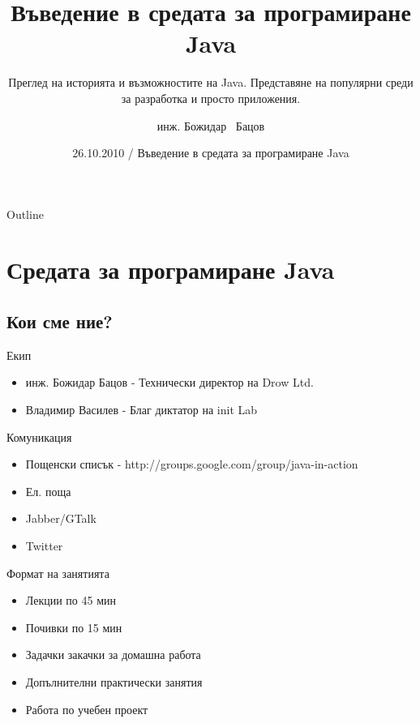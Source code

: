 \documentclass{beamer}
\title[Въведение в средата за програмиране Java] %
{Въведение в средата за програмиране Java}
\subtitle
{Преглед на историята и възможностите на Java. Представяне на
  популярни среди за разработка и просто приложения.} %
\author[инж. Божидар Бацов]{инж. Божидар ~Бацов}
\institute[Drow Ltd.]{Drow Ltd.}
\date[Java Begins]{26.10.2010 / Въведение в средата за програмиране Java}
\begin{document}
\begin{frame}
  \titlepage
\end{frame}

\begin{frame}{Outline}
  \tableofcontents
\end{frame}




\section{Средата за програмиране Java}

\subsection[Кои сме ние?]{Кои сме ние?}

\begin{frame}{Екип}
  \begin{itemize}
  \item
    инж. Божидар Бацов - Технически директор на Drow Ltd.
  \item
    Владимир Василев - Благ диктатор на init Lab
  \end{itemize}
\end{frame}

\begin{frame}{Комуникация}
  \begin{itemize}
  \item Пощенски списък - http://groups.google.com/group/java-in-action
  \item Ел. поща
  \item Jabber/GTalk
  \item Twitter
  \end{itemize}
\end{frame}

\begin{frame}{Формат на занятията}
  \begin{itemize}
  \item Лекции по 45 мин
  \item Почивки по 15 мин
  \item Задачки закачки за домашна работа
  \item Допълнителни практически занятия
  \item Работа по учебен проект
  \end{itemize}
\end{frame}
\end{document}
